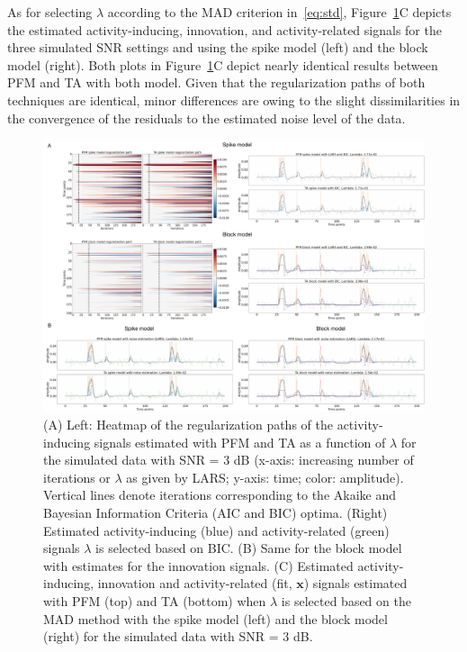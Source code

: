  As for selecting $\lambda$ according to the MAD criterion in~\eqref{eq:std}, Figure~\ref{fig:sim}C depicts the estimated activity-inducing, innovation, and activity-related signals for the three simulated SNR settings and using the spike model (left) and the block model (right). Both plots in Figure~\ref{fig:sim}C depict nearly identical results between PFM and TA with both model. Given that the regularization paths of both techniques are identical, minor differences are owing to the slight dissimilarities in the convergence of the residuals to the estimated noise level of the data.

 \begin{figure}[t!]
    \begin{center}
        \includegraphics[width=\textwidth]{figures/figure_sim.pdf}
    \end{center}
    \caption{(A) Left: Heatmap of the regularization paths of the activity-inducing signals estimated with PFM and TA as a function of $\lambda$ for the simulated data with SNR = 3 dB (x-axis: increasing number of iterations or $\lambda$ as given by LARS; y-axis: time; color: amplitude). Vertical lines denote iterations corresponding to the Akaike and Bayesian Information Criteria (AIC and BIC) optima. (Right) Estimated activity-inducing (blue) and activity-related (green) signals $\lambda$ is selected based on BIC. (B) Same for the block model with estimates for the innovation signals. (C) Estimated activity-inducing, innovation and activity-related (fit, $\mathbf{x}$) signals estimated with PFM (top) and TA (bottom) when $\lambda$ is selected based on the MAD method with the spike model (left) and the block model (right) for the simulated data with SNR = 3 dB.}
\label{fig:sim}
\end{figure}

